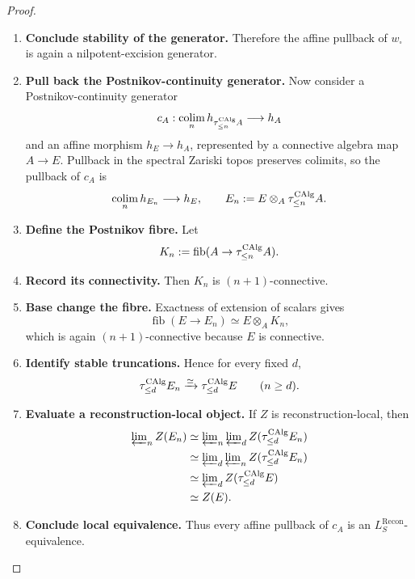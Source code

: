 \begin{proof}
\begin{enumerate}[label=\textup{(\arabic*)}]
    connective.
    \item \textbf{Conclude stability of the generator.}
    Therefore the affine pullback of \(w_\square\) is again a
    nilpotent-excision generator.
    \item \textbf{Pull back the Postnikov-continuity generator.}
    Now consider a Postnikov-continuity generator
    \[
        c_A:
        \operatorname*{colim}_nh_{\tau_{\leq n}^{\operatorname{CAlg}}A}
        \longrightarrow
        h_A
    \]
    and an affine morphism \(h_E\to h_A\), represented by a connective algebra map
    \(A\to E\). Pullback in the spectral Zariski topos preserves colimits, so the
    pullback of \(c_A\) is
    \[
        \operatorname*{colim}_nh_{E_n}
        \longrightarrow
        h_E,
        \qquad
        E_n:=E\otimes_A\tau_{\leq n}^{\operatorname{CAlg}}A.
    \]
    \item \textbf{Define the Postnikov fibre.}
    Let
    \[
        K_n:=\operatorname{fib}(A\to\tau_{\leq n}^{\operatorname{CAlg}}A).
    \]
    \item \textbf{Record its connectivity.}
    Then \(K_n\) is \((n+1)\)-connective.
    \item \textbf{Base change the fibre.}
    Exactness of extension of scalars gives
    \[
        \operatorname{fib}(E\to E_n)
        \simeq
        E\otimes_AK_n,
    \]
    which is again \((n+1)\)-connective because \(E\) is connective.
    \item \textbf{Identify stable truncations.}
    Hence for
    every fixed \(d\),
    \[
        \tau_{\leq d}^{\operatorname{CAlg}}E_n
        \xrightarrow{\simeq}
        \tau_{\leq d}^{\operatorname{CAlg}}E
        \qquad(n\geq d).
    \]
    \item \textbf{Evaluate a reconstruction-local object.}
    If \(Z\) is reconstruction-local, then
    \[
    \begin{aligned}
        \varprojlim\nolimits_nZ(E_n)
        &\simeq
        \varprojlim\nolimits_n\varprojlim\nolimits_dZ(\tau_{\leq d}^{\operatorname{CAlg}}E_n)
        \\
        &\simeq
        \varprojlim\nolimits_d\varprojlim\nolimits_nZ(\tau_{\leq d}^{\operatorname{CAlg}}E_n)
        \\
        &\simeq
        \varprojlim\nolimits_dZ(\tau_{\leq d}^{\operatorname{CAlg}}E)
        \\
        &\simeq
        Z(E).
    \end{aligned}
    \]
    \item \textbf{Conclude local equivalence.}
    Thus every affine pullback of \(c_A\) is an
    \(L^{\mathrm{Recon}}_S\)-equivalence.

\end{enumerate}
\end{proof}
